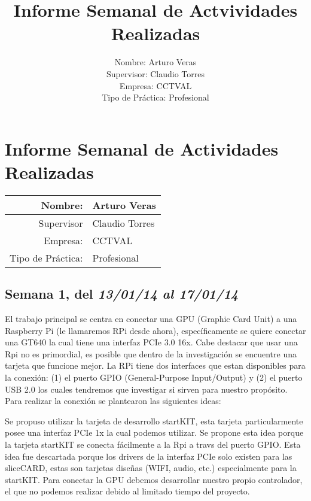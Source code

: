 \documentclass[11pt,oneside,titlepage]{article}
\begin{document}
\title{Informe Semanal de Actvividades Realizadas}
\author{Nombre: Arturo Veras\\ 
	Supervisor: Claudio Torres\\
	Empresa: CCTVAL \\
Tipo de Práctica: Profesional}
%
\section*{Informe Semanal de Actividades Realizadas}
\begin{center}

\begin{tabular}{|r|l|}
\hline 
Nombre:  & Arturo Veras\\ 
\hline 
Supervisor & Claudio Torres \\ 
\hline 
Empresa: & CCTVAL \\ 
\hline 
Tipo de Práctica: & Profesional \\ 
\hline 
\end{tabular} 

\end{center}
\subsection*{Semana 1, del \textit{13/01/14 al 17/01/14}}

El trabajo principal se centra en conectar una GPU (Graphic Card Unit) a una
Raspberry Pi (le llamaremos RPi desde ahora), específicamente se quiere
conectar una GT640 la cual tiene una interfaz PCIe 3.0 16x. Cabe destacar que
usar una Rpi no es primordial, es posible que dentro de la investigación se
encuentre una tarjeta que funcione mejor.  La RPi tiene dos interfaces que
estan disponibles para la conexión: (1) el puerto GPIO (General-Purpose
Input/Output) y (2) el puerto USB 2.0 los cuales tendremos que investigar si
sirven para nuestro propósito.  Para realizar la conexión se plantearon las
siguientes ideas:

Se propuso utilizar la tarjeta de desarrollo startKIT, esta tarjeta
particularmente posee una interfaz PCIe  1x la cual podemos utilizar.  Se
propone esta idea porque la tarjeta startKIT se conecta fácilmente a la Rpi a
travs del puerto GPIO.  Esta idea fue descartada porque los drivers de la
interfaz PCIe solo existen para las sliceCARD, estas son tarjetas diseñas
(WIFI, audio, etc.) especialmente para la startKIT. Para conectar la GPU
debemos desarrollar nuestro propio controlador, el que no podemos realizar
debido al limitado tiempo del proyecto.  
\end{document}
